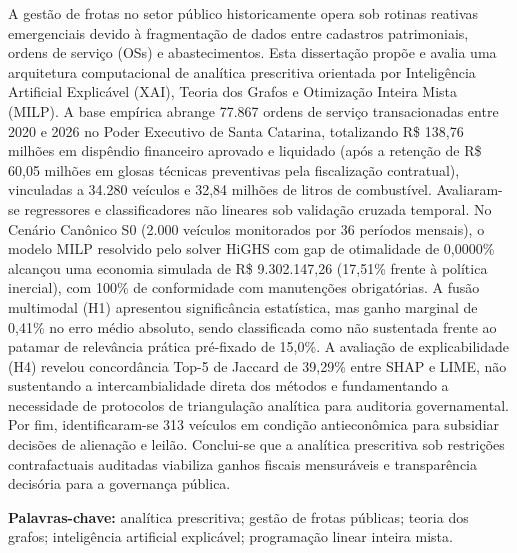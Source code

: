 \begin{resumo}
A gestão de frotas no setor público historicamente opera sob rotinas reativas emergenciais devido à fragmentação de dados entre cadastros patrimoniais, ordens de serviço (OSs) e abastecimentos. Esta dissertação propõe e avalia uma arquitetura computacional de analítica prescritiva orientada por Inteligência Artificial Explicável (XAI), Teoria dos Grafos e Otimização Inteira Mista (MILP). A base empírica abrange 77.867 ordens de serviço transacionadas entre 2020 e 2026 no Poder Executivo de Santa Catarina, totalizando R\$ 138,76 milhões em dispêndio financeiro aprovado e liquidado (após a retenção de R\$ 60,05 milhões em glosas técnicas preventivas pela fiscalização contratual), vinculadas a 34.280 veículos e 32,84 milhões de litros de combustível. Avaliaram-se regressores e classificadores não lineares sob validação cruzada temporal. No Cenário Canônico S0 (2.000 veículos monitorados por 36 períodos mensais), o modelo MILP resolvido pelo solver HiGHS com gap de otimalidade de 0,0000\% alcançou uma economia simulada de R\$ 9.302.147,26 (17,51\% frente à política inercial), com 100\% de conformidade com manutenções obrigatórias. A fusão multimodal (H1) apresentou significância estatística, mas ganho marginal de 0,41\% no erro médio absoluto, sendo classificada como não sustentada frente ao patamar de relevância prática pré-fixado de 15,0\%. A avaliação de explicabilidade (H4) revelou concordância Top-5 de Jaccard de 39,29\% entre SHAP e LIME, não sustentando a intercambialidade direta dos métodos e fundamentando a necessidade de protocolos de triangulação analítica para auditoria governamental. Por fim, identificaram-se 313 veículos em condição antieconômica para subsidiar decisões de alienação e leilão. Conclui-se que a analítica prescritiva sob restrições contrafactuais auditadas viabiliza ganhos fiscais mensuráveis e transparência decisória para a governança pública.

\vspace{\onelineskip}
\noindent
\textbf{Palavras-chave:} analítica prescritiva; gestão de frotas públicas; teoria dos grafos; inteligência artificial explicável; programação linear inteira mista.
\end{resumo}
